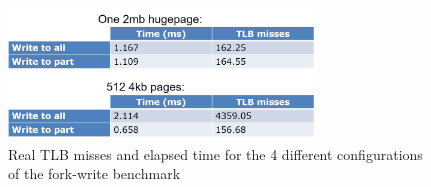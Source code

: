 \begin{figure}
    \centering
    \includegraphics[width=3.2in]{Figures/Table1}
    \caption{Real TLB misses and elapsed time for the 4 different configurations of the fork-write benchmark}
    \label{fig:tables}
\end{figure}